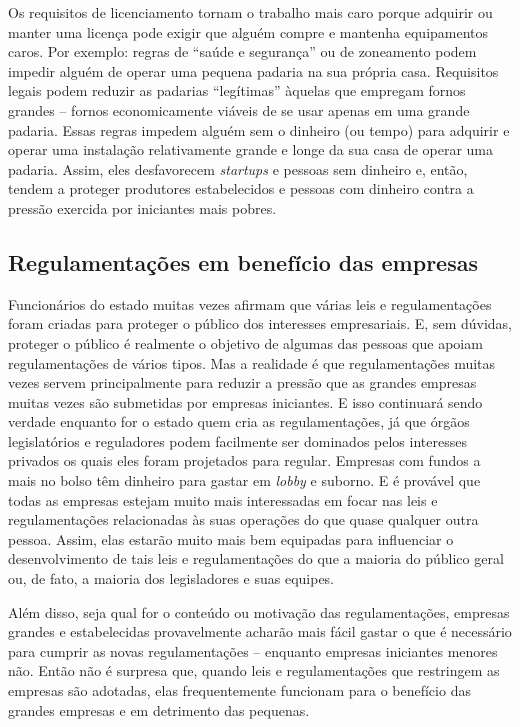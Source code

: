 Os requisitos de licenciamento tornam o trabalho mais caro porque adquirir ou manter uma licença pode exigir que alguém compre e mantenha equipamentos caros. Por exemplo: regras de ``saúde e segurança'' ou de zoneamento podem impedir alguém de operar uma pequena padaria na sua própria casa. Requisitos legais podem reduzir as padarias ``legítimas'' àquelas que empregam fornos grandes -- fornos economicamente viáveis de se usar apenas em uma grande padaria. Essas regras impedem alguém sem o dinheiro (ou tempo) para adquirir e operar uma instalação relativamente grande e longe da sua casa de operar uma padaria. Assim, eles desfavorecem \emph{startups} e pessoas sem dinheiro e, então, tendem a proteger produtores estabelecidos e pessoas com dinheiro contra a pressão exercida por iniciantes mais pobres.

\subsection*{Regulamentações em benefício das empresas}

Funcionários do estado muitas vezes afirmam que várias leis e regulamentações foram criadas para proteger o público dos interesses empresariais. E, sem dúvidas, proteger o público é realmente o objetivo de algumas das pessoas que apoiam regulamentações de vários tipos. Mas a realidade é que regulamentações muitas vezes servem principalmente para reduzir a pressão que as grandes empresas muitas vezes são submetidas por empresas iniciantes. E isso continuará sendo verdade enquanto for o estado quem cria as regulamentações, já que órgãos legislatórios e reguladores podem facilmente ser dominados pelos interesses privados os quais eles foram projetados para regular. Empresas com fundos a mais no bolso têm dinheiro para gastar em \emph{lobby} e suborno. E é provável que todas as empresas estejam muito mais interessadas em focar nas leis e regulamentações relacionadas às suas operações do que quase qualquer outra pessoa. Assim, elas estarão muito mais bem equipadas para influenciar o desenvolvimento de tais leis e regulamentações do que a maioria do público geral ou, de fato, a maioria dos legisladores e suas equipes.

Além disso, seja qual for o conteúdo ou motivação das regulamentações, empresas grandes e estabelecidas provavelmente acharão mais fácil gastar o que é necessário para cumprir as novas regulamentações -- enquanto empresas iniciantes menores não. Então não é surpresa que, quando leis e regulamentações que restringem as empresas são adotadas, elas frequentemente funcionam para o benefício das grandes empresas e em detrimento das pequenas.

